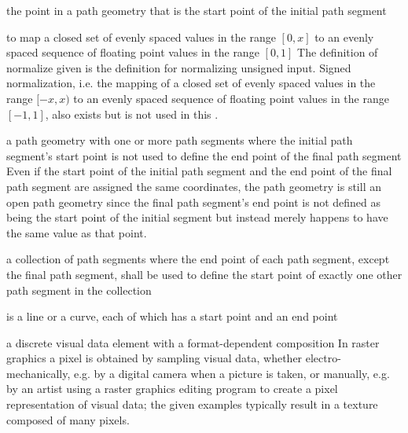 the point in a path geometry that is the start point of the initial path segment

to map a closed set of evenly spaced values in the range $[0, x]$ to an evenly spaced sequence of floating point values in the range $[0, 1]$
\enternote
The definition of normalize given is the definition for normalizing unsigned input. Signed normalization, i.e. the mapping of a closed set of evenly spaced values in the range $[-x, x)$ to an evenly spaced sequence of floating point values in the range $[-1, 1]$, also exists but is not used in this \documenttypename{}.
\exitnote

a path geometry with one or more path segments where the initial path segment's start point is not used to define the end point of the final path segment
\enternote
Even if the start point of the initial path segment and the end point of the final path segment are assigned the same coordinates, the path geometry is still an open path geometry since the final path segment's end point is not defined as being the start point of the initial segment but instead merely happens to have the same value as that point.
\exitnote

a collection of path segments where the end point of each path segment, except the final path segment, shall be used to define the start point of exactly one other path segment in the collection

is a line or a curve, each of which has a start point and an end point

a discrete visual data element with a format-dependent composition
\enternote
In raster graphics a pixel is obtained by sampling visual data, whether 
electro-mechanically, e.g. by a digital camera when a picture is taken, or 
manually, e.g. by an artist using a raster graphics editing program to create a 
pixel representation of visual data; the given examples typically result in a 
texture composed of many pixels.
\exitnote

